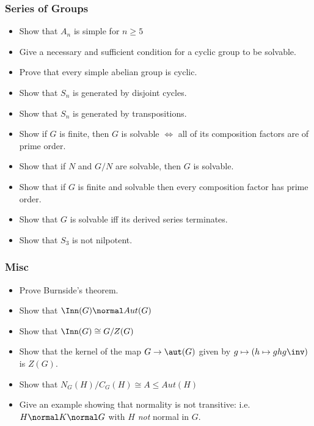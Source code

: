 \hypertarget{series-of-groups-1}{%
\subsubsection{Series of Groups}\label{series-of-groups-1}}

\begin{itemize}
\tightlist
\item
  Show that \(A_n\) is simple for \(n\geq 5\)
\item
  Give a necessary and sufficient condition for a cyclic group to be
  solvable.
\item
  Prove that every simple abelian group is cyclic.
\item
  Show that \(S_n\) is generated by disjoint cycles.
\item
  Show that \(S_n\) is generated by transpositions.
\item
  Show if \(G\) is finite, then \(G\) is solvable \(\iff\) all of its
  composition factors are of prime order.
\item
  Show that if \(N\) and \(G/N\) are solvable, then \(G\) is solvable.
\item
  Show that if \(G\) is finite and solvable then every composition
  factor has prime order.
\item
  Show that \(G\) is solvable iff its derived series terminates.
\item
  Show that \(S_3\) is not nilpotent.
\end{itemize}

\hypertarget{misc}{%
\subsubsection{Misc}\label{misc}}

\begin{itemize}
\item
  Prove Burnside's theorem.
\item
  Show that \(\Inn(G) \normal Aut(G)\)
\item
  Show that \(\Inn(G) \cong G / Z(G)\)
\item
  Show that the kernel of the map \(G\to \aut(G)\) given by
  \(g\mapsto (h\mapsto ghg\inv)\) is \(Z(G)\).
\item
  Show that \(N_G(H) / C_G(H) \cong A \leq Aut(H)\)
\item
  Give an example showing that normality is not transitive:
  i.e.~\(H\normal K \normal G\) with \(H\) \emph{not} normal in \(G\).
\end{itemize}

